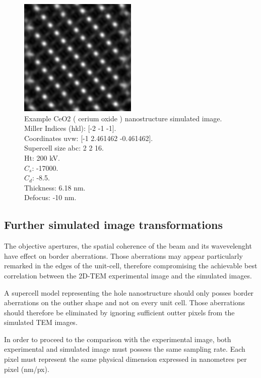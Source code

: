 \documentclass[
  oneside,
  11pt, a4paper,
  footinclude=true,
  headinclude=true,
  cleardoublepage=empty
]{scrbook}
\begin{document}
	\begin{figure}[!ht]
	\begin{center}
		\includegraphics[width=0.5\textwidth]{img/003_002_Ce02_b_t__6dot18_d__-10.png}
			\caption[Example CeO2 nanostructure simulated image]{Example CeO2 ( cerium oxide ) nanostructure simulated image.\\
			Miller Indices  (hkl): [-2 -1 -1].\\
			Coordinates uvw: [-1 2.461462 -0.461462].\\
			Supercell size abc: 2 2 16.\\
			Ht: 200 kV.\\
			{$C_s$}: -17000.\\ 
			{$C_d$}: -8.5.\\
			Thickness: 6.18 nm.\\
			Defocus: -10 nm.
			}
	\label{fig:sim_cerium_oxide}
	\end{center}
	\end{figure}
	
	\subsection{Further simulated image transformations}
	
	
	The objective apertures, the spatial coherence of the beam and its wavevelenght have effect on border aberrations. Those aberrations may appear particularly remarked in the edges of the unit-cell, therefore compromising the achievable best correlation between the 2D-TEM experimental image and the simulated images.\par 
	A supercell model representing the hole nanostructure should only posses border aberrations on the outher shape and not on every unit cell. Those aberrations should therefore be eliminated by ignoring sufficient outter pixels from the simulated TEM images.\par 
	In order to proceed to the comparison with the experimental image, both experimental and simulated image must possess the same sampling rate. Each pixel must represent the same physical dimension expressed in nanometres per pixel (nm/px).\par 
	
\end{document}
